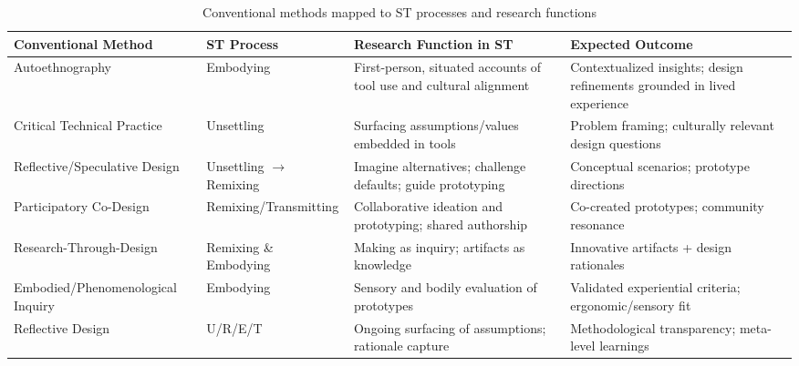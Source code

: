 		\begin{table}[h]
			\centering
			\scriptsize                          
			\setlength{\tabcolsep}{4pt}	%
			\renewcommand{\arraystretch}{2}	%
			\setlength\emergencystretch{2em}	%
			\begin{tabular}{>{\RaggedRight\arraybackslash}p{3.6cm} 
							>{\RaggedRight\arraybackslash}p{3.0cm} 
							>{\RaggedRight\arraybackslash}p{4.8cm} 
							>{\RaggedRight\arraybackslash}p{4.0cm}}
				\toprule
				\textbf{Conventional Method} & \textbf{ST Process} & \textbf{Research Function in ST} & \textbf{Expected Outcome} \\
				\midrule
				Autoethnography & Embodying & First-person, situated accounts of tool use and cultural alignment & Contextualized insights; design refinements grounded in lived experience \\
				Critical Technical Practice & Unsettling & Surfacing assumptions/values embedded in tools & Problem framing; culturally relevant design questions \\
				Reflective/Speculative Design & Unsettling $\rightarrow$ Remixing & Imagine alternatives; challenge defaults; guide prototyping & Conceptual scenarios; prototype directions \\
				Participatory Co-Design & Remixing/Transmitting & Collaborative ideation and prototyping; shared authorship & Co-created prototypes; community resonance \\
				Research-Through-Design & Remixing \& Embodying & Making as inquiry; artifacts as knowledge & Innovative artifacts + design rationales \\
				Embodied/Phenomenological Inquiry & Embodying & Sensory and bodily evaluation of prototypes & Validated experiential criteria; ergonomic/sensory fit \\
				Reflective Design & U/R/E/T & Ongoing surfacing of assumptions; rationale capture & Methodological transparency; meta-level learnings \\
				\bottomrule
			\end{tabular}
			\caption{Conventional methods mapped to ST processes and research functions}
		\end{table}
	\restoregeometry

